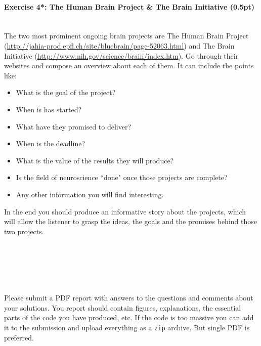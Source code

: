 \documentclass[a4paper,11pt]{article}
\newenvironment{exercise}[3]{\paragraph{Exercise #1: #2 (#3pt)}\ \\}{
\medskip}
\begin{document}
%
%
\begin{exercise}{4*}{The Human Brain Project \& The Brain Initiative}{0.5}
The two most prominent ongoing brain projects are The Human Brain Project (\url{http://jahia-prod.epfl.ch/site/bluebrain/page-52063.html}) and The Brain Initiative (\url{http://www.nih.gov/science/brain/index.htm}). Go through their websites and compose an overview about each of them. It can include the points like:
\begin{itemize}
\itemsep 0em
	\item What is the goal of the project?
	\item When is has started?
	\item What have they promised to deliver?
	\item When is the deadline?
	\item What is the value of the results they will produce?
	\item Is the field of neuroscience ``done" once those projects are complete?
	\item Any other information you will find interesting.
\end{itemize}
In the end you should produce an informative story about the projects, which will allow the listener to grasp the ideas, the goals and the promises behind those two projects.
\end{exercise}


\ \\
\ \\
\ \\
\ \\
\ \\
Please submit a PDF report with answers to the questions and comments about your solutions. You report should contain figures, explanations, the essential parts of the code you have produced, etc. If the code is too massive you can add it to the submission and upload everything as a \texttt{zip} archive. But single PDF is preferred.
\end{document}
